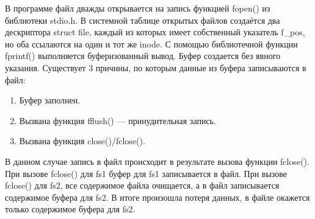В программе файл дважды открывается на запись функцией fopen() из библиотеки stdio.h. В системной таблице открытых файлов создаётся два дескриптора struct file, каждый из которых имеет собственный указатель f\_pos, но оба ссылаются на один и тот же inode. С помощью библиотечной функции fprintf() выполняется буферизованный вывод. Буфер создается без явного указания. Существует 3 причины, по которым данные из буфера записываются в файл:

\begin{enumerate}[label*=\arabic*.]
	\item Буфер заполнен.
	\item Вызвана функция fflush() --- принудительная запись.
	\item Вызвана функция close()/fclose().
\end{enumerate}

В данном случае запись в файл происходит в результате вызова функции fclose(). При вызове fclose() для fs1 буфер для fs1 записывается в файл. При вызове fclose() для fs2, все содержимое файла очищается, а в файл записывается содержимое буфера для fs2. В итоге произошла потеря данных, в файле окажется только содержимое буфера для fs2.



\newpage
